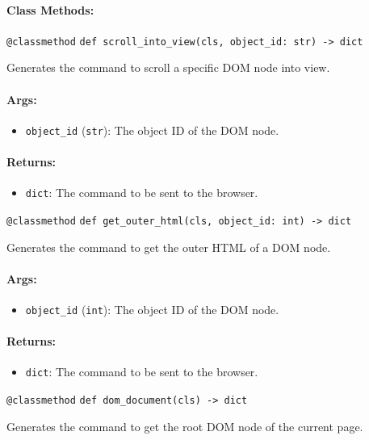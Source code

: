 \documentclass{article}
\begin{document}
\paragraph{Class Methods:}
\noindent\texttt{@classmethod}
\noindent\texttt{def scroll\_into\_view(cls, object\_id: str) -> dict}

\noindent Generates the command to scroll a specific DOM node into view.

\paragraph{Args:}
\begin{itemize}
    \item \texttt{object\_id} (\texttt{str}): The object ID of the DOM node.
\end{itemize}

\paragraph{Returns:}
\begin{itemize}
    \item \texttt{dict}: The command to be sent to the browser.
\end{itemize}

\noindent\texttt{@classmethod}
\noindent\texttt{def get\_outer\_html(cls, object\_id: int) -> dict}

\noindent Generates the command to get the outer HTML of a DOM node.

\paragraph{Args:}
\begin{itemize}
    \item \texttt{object\_id} (\texttt{int}): The object ID of the DOM node.
\end{itemize}

\paragraph{Returns:}
\begin{itemize}
    \item \texttt{dict}: The command to be sent to the browser.
\end{itemize}

\noindent\texttt{@classmethod}
\noindent\texttt{def dom\_document(cls) -> dict}

\noindent Generates the command to get the root DOM node of the current page.
\end{document}
